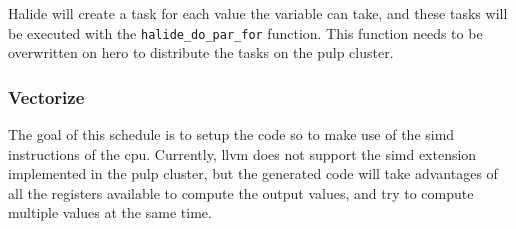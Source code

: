 Halide will create a task for each value the variable can take, and these tasks will be executed with the \texttt{halide\_do\_par\_for} function. This function needs to be overwritten on \gls{hero} to distribute the tasks on the \gls{pulp} cluster. 


	\subsubsection{Vectorize}
	The goal of this schedule is to setup the code so to make use of the \gls{simd} instructions of the \gls{cpu}. Currently, \gls{llvm} does not support the \gls{simd} extension implemented in the \gls{pulp} cluster, but the generated code will take advantages of all the registers available to compute the output values, and try to compute multiple values at the same time.





		

